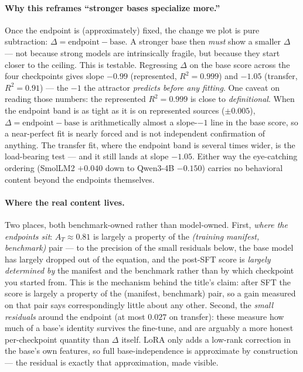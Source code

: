 \paragraph{Why this reframes ``stronger bases specialize more.''} Once the endpoint is (approximately)
fixed, the change we plot is pure subtraction: $\Delta = \text{endpoint} - \text{base}$. A stronger base
then \emph{must} show a smaller $\Delta$ --- not because strong models are intrinsically fragile, but
because they start closer to the ceiling. This is testable. Regressing $\Delta$ on the
base score across the four checkpoints gives slope $-0.99$ (represented, $R^2=0.999$) and $-1.05$ (transfer,
$R^2=0.91$) --- the $-1$ the attractor \emph{predicts before any fitting}. One caveat on reading those
numbers: the represented $R^2=0.999$ is close to \emph{definitional}. When the endpoint band is as tight as
it is on represented sources ($\pm0.005$), $\Delta=\text{endpoint}-\text{base}$ is arithmetically almost a
slope-$-1$ line in the base score, so a near-perfect fit is nearly forced and is not independent
confirmation of anything. The transfer fit, where the endpoint band is several times wider, is the
load-bearing test --- and it still lands at slope $-1.05$. Either way the eye-catching ordering
(SmolLM2 $+0.040$ down to Qwen3-4B $-0.150$) carries no behavioral content beyond the endpoints themselves.

\paragraph{Where the real content lives.} Two places, both benchmark-owned rather than model-owned. First,
\emph{where the endpoints sit}: $A_T\approx0.81$ is largely a property of the \emph{(training manifest,
benchmark)} pair --- to the precision of the small residuals below, the base model has largely dropped out
of the equation, and the post-SFT score is \emph{largely determined by} the manifest and the benchmark
rather than by which checkpoint you started from. This is the mechanism behind the title's claim:
after SFT the score is largely a property of the (manifest, benchmark) pair, so a gain measured on that
pair says correspondingly little about any other. Second, the \emph{small residuals} around the
endpoint (at most $0.027$ on transfer): these measure how much of a base's identity survives the fine-tune,
and are arguably a more honest per-checkpoint quantity than $\Delta$ itself. LoRA only adds a low-rank
correction in the base's own features, so full base-independence is approximate by construction --- the
residual is exactly that approximation, made visible.

